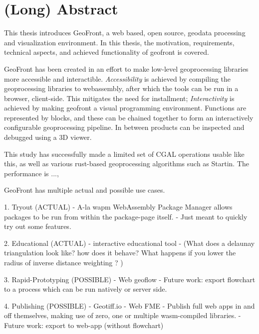
\chapter*{ (Long) Abstract }

This thesis introduces GeoFront, a web based, open source, geodata processing and visualization environment. 
In this thesis, the motivation, requirements, technical aspects, and achieved functionality of geofront is covered. 

GeoFront has been created in an effort to make low-level geoprocessing libraries more accessible and interactible.
\emph{Accessibility} is achieved by compiling the geoprocessing libraries to webassembly, after which the tools can be run in a browser, client-side. 
This mitigates the need for installment; 
\emph{Interactivity} is achieved by making geofront a visual programming environment. 
Functions are represented by blocks, and these can be chained together to form an interactively configurable geoprocessing pipeline. 
In between products can be inspected and debugged using a 3D viewer. 

This study has successfully made a limited set of CGAL operations usable like this, as well as various rust-based geoprocessing algorithms such as Startin.
The performance is ..., 

GeoFront has multiple actual and possible use cases. 

1. Tryout (ACTUAL)
   - A-la wapm WebAssembly Package Manager allows packages to be run from within the package-page itself. 
  - Just meant to quickly try out some features.

2. Educational (ACTUAL)
   - interactive educational tool
   - (What does a delaunay triangulation look like? how does it behave? What happens if you lower the radius of inverse distance weighting ? )

3. Rapid-Prototyping (POSSIBLE)
   - Web geoflow
   - Future work: export flowchart to a process which can be run natively or server side.

4. Publishing (POSSIBLE)
   - Geotiff.io
   - Web FME 
   - Publish full web apps in and off themselves, making use of zero, one or multiple wasm-compiled libraries.  
   - Future work: export to web-app (without flowchart)

